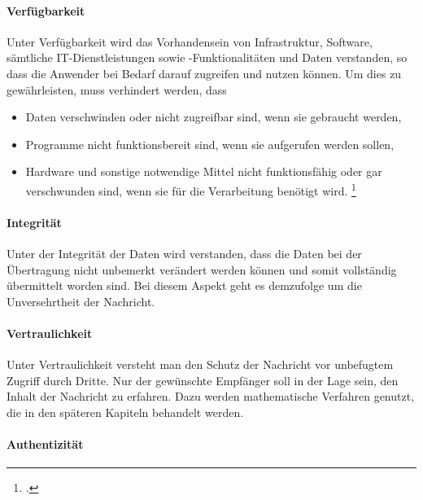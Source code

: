 \documentclass  [paper=a4,
				fontsize=12pt,
				listof=totoc,
				bibliography=totoc
				]{scrreprt}
\begin{document}
	\paragraph{Verfügbarkeit}
	
	Unter Verfügbarkeit wird das Vorhandensein von Infrastruktur, Software, sämtliche IT-Dienstleistungen sowie -Funktionalitäten und Daten verstanden, so dass die Anwender bei Bedarf darauf zugreifen und nutzen können. Um dies zu gewährleisten, muss verhindert werden, dass
	\begin{itemize}
	\item Daten verschwinden oder nicht zugreifbar sind, wenn sie gebraucht werden,
	\item Programme nicht funktionsbereit sind, wenn sie aufgerufen werden sollen,
	\item Hardware und sonstige notwendige Mittel nicht funktionsfähig oder gar verschwunden sind, wenn sie für die Verarbeitung benötigt wird. \footcite{Berliner2014}
	\end{itemize}
	
	\paragraph{Integrität}
	
	Unter der Integrität der Daten wird verstanden, dass die Daten bei der Übertragung nicht unbemerkt verändert werden können und somit vollständig übermittelt worden sind. Bei diesem Aspekt geht es demzufolge um die Unversehrtheit der Nachricht.
	
	\paragraph{Vertraulichkeit}
	
	Unter Vertraulichkeit versteht man den Schutz der Nachricht vor unbefugtem Zugriff durch Dritte. Nur der gewünschte Empfänger soll in der Lage sein, den Inhalt der Nachricht zu erfahren. Dazu werden mathematische Verfahren genutzt, die in den späteren Kapiteln behandelt werden.
	
	\paragraph{Authentizität}
	
\end{document}
